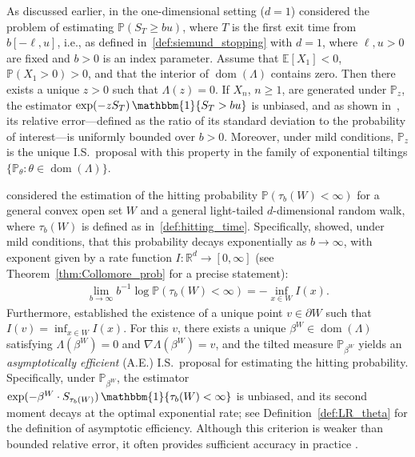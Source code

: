 \documentclass[aap,preprint]{imsart}
\newcommand{\Pro}{{\mathbb{P}}}
\theoremstyle{plain}
\theoremstyle{definition}
\begin{document}
As discussed earlier, in the one-dimensional setting ($d = 1$)  \citet{siegmund1976importance} considered the problem of estimating $\Pro(S_T \geq b u)$, where $T$ is the first exit time from $b[-\ell,u]$, i.e., as defined in~\eqref{def:siemund_stopping} with $d=1$, where $\ell, u > 0$ are fixed and $b > 0$ is an index parameter. Assume that $\mathbb{E}[X_1] < 0$, $\Pro(X_1 > 0) > 0$, and that the interior of $\operatorname{dom}(\Lambda)$ contains zero. Then there exists a unique $z > 0$ such that $\Lambda(z) = 0$. If $X_n$, $n \geq 1$, are generated under $\Pro_{z}$, the estimator $\exp(-z S_T)\, \mathbbm{1}\{S_T > bu\}$ is unbiased, and as shown in~\citet{siegmund1976importance}, its relative error---defined as the ratio of its standard deviation to the probability of interest---is uniformly bounded over $b > 0$. Moreover, under mild conditions, $\Pro_{z}$ is the unique I.S.~proposal with this property in the family of exponential tiltings $\{\Pro_{\theta} : \theta \in \operatorname{dom}(\Lambda)\}$.




\citet{collamore1996,collamore2002} considered the estimation of the hitting probability 
$\mathbb{P}(\tau_b(W) < \infty)$ for a general convex open set $W$ and a general light-tailed $d$-dimensional random walk, where $\tau_b(W)$ is defined as in~\eqref{def:hitting_time}. Specifically, \citet{collamore1996} showed, under mild conditions, that this probability decays exponentially as $b \to \infty$, with exponent given by a rate function $I : \mathbb{R}^d \to [0,\infty]$ (see Theorem~\ref{thm:Collomore_prob} for a precise statement):
\begin{align}
    \label{def:intro_rate}
    \lim_{b \to \infty} b^{-1} \log \mathbb{P}(\tau_b(W) < \infty) = -\inf_{x \in W} I(x).
\end{align}
Furthermore, \citet{collamore2002} established the existence of a unique point $v \in \partial W$ such that $I(v) = \inf_{x \in W} I(x)$. For this $v$, there exists a unique $\beta^{W} \in \operatorname{dom}(\Lambda)$ satisfying $\Lambda(\beta^{W}) = 0$ and $\nabla \Lambda(\beta^{W}) = v$, and the tilted measure $\mathbb{P}_{\beta^{W}}$ yields an \textit{asymptotically efficient} (A.E.) I.S.~proposal for estimating the hitting probability. Specifically, under $\mathbb{P}_{\beta^{W}}$, the estimator $\exp(-\beta^{W} \cdot S_{\tau_b(W)}) \, \mathbbm{1}\{\tau_b(W) < \infty\}$ is unbiased, and its second moment decays at the optimal exponential rate; see Definition~\ref{def:LR_theta} for the definition of asymptotic efficiency. Although this criterion is weaker than bounded relative error, it often provides sufficient accuracy in practice \citep{asmussen2007stochastic}.
\end{document}
